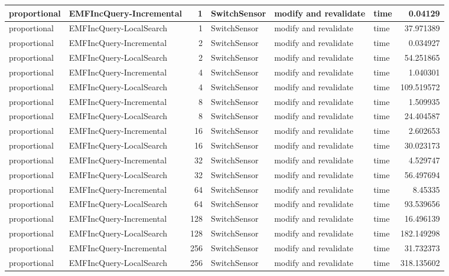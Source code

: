 \begin{table}
\begin{tabular}{| l | l | r | l | l | l | r |}
proportional & EMFIncQuery-Incremental & 1 & SwitchSensor & modify and revalidate & time & 0.04129\\\hline
proportional & EMFIncQuery-LocalSearch & 1 & SwitchSensor & modify and revalidate & time & 37.971389\\\hline
proportional & EMFIncQuery-Incremental & 2 & SwitchSensor & modify and revalidate & time & 0.034927\\\hline
proportional & EMFIncQuery-LocalSearch & 2 & SwitchSensor & modify and revalidate & time & 54.251865\\\hline
proportional & EMFIncQuery-Incremental & 4 & SwitchSensor & modify and revalidate & time & 1.040301\\\hline
proportional & EMFIncQuery-LocalSearch & 4 & SwitchSensor & modify and revalidate & time & 109.519572\\\hline
proportional & EMFIncQuery-Incremental & 8 & SwitchSensor & modify and revalidate & time & 1.509935\\\hline
proportional & EMFIncQuery-LocalSearch & 8 & SwitchSensor & modify and revalidate & time & 24.404587\\\hline
proportional & EMFIncQuery-Incremental & 16 & SwitchSensor & modify and revalidate & time & 2.602653\\\hline
proportional & EMFIncQuery-LocalSearch & 16 & SwitchSensor & modify and revalidate & time & 30.023173\\\hline
proportional & EMFIncQuery-Incremental & 32 & SwitchSensor & modify and revalidate & time & 4.529747\\\hline
proportional & EMFIncQuery-LocalSearch & 32 & SwitchSensor & modify and revalidate & time & 56.497694\\\hline
proportional & EMFIncQuery-Incremental & 64 & SwitchSensor & modify and revalidate & time & 8.45335\\\hline
proportional & EMFIncQuery-LocalSearch & 64 & SwitchSensor & modify and revalidate & time & 93.539656\\\hline
proportional & EMFIncQuery-Incremental & 128 & SwitchSensor & modify and revalidate & time & 16.496139\\\hline
proportional & EMFIncQuery-LocalSearch & 128 & SwitchSensor & modify and revalidate & time & 182.149298\\\hline
proportional & EMFIncQuery-Incremental & 256 & SwitchSensor & modify and revalidate & time & 31.732373\\\hline
proportional & EMFIncQuery-LocalSearch & 256 & SwitchSensor & modify and revalidate & time & 318.135602\\\hline

\end{tabular}
\end{table}
